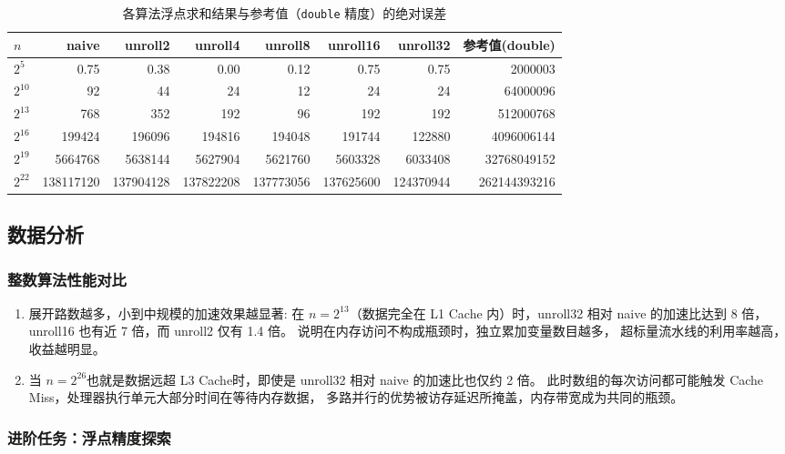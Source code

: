 \documentclass[a4paper]{article}
\begin{document}
\begin{table}[!ht]
\centering
\caption{各算法浮点求和结果与参考值（\texttt{double} 精度）的绝对误差}
\label{table:exp2_float}
\begin{tabular}{@{}lrrrrrrr@{}}
\toprule
$n$ & naive & unroll2 & unroll4 & unroll8 & unroll16 & unroll32 & 参考值(double) \\
\midrule
$2^5$   & 0.75   & 0.38   & 0.00   & 0.12   & 0.75   & 0.75   & 2000003 \\
$2^{10}$ & 92     & 44     & 24     & 12     & 24     & 24     & 64000096 \\
$2^{13}$ & 768    & 352    & 192    & 96     & 192    & 192    & 512000768 \\
$2^{16}$ & 199424 & 196096 & 194816 & 194048 & 191744 & 122880 & 4096006144 \\
$2^{19}$ & 5664768 & 5638144 & 5627904 & 5621760 & 5603328 & 6033408 & 32768049152 \\
$2^{22}$ & 138117120 & 137904128 & 137822208 & 137773056 & 137625600 & 124370944 & 262144393216 \\
\bottomrule
\end{tabular}
\end{table}

\subsection{数据分析}

\subsubsection{整数算法性能对比}
\begin{enumerate}
    \item 展开路数越多，小到中规模的加速效果越显著:
    在 $n=2^{13}$（数据完全在 L1 Cache 内）时，unroll32 相对 naive 的加速比达到 8 倍，
unroll16 也有近 7 倍，而 unroll2 仅有 1.4 倍。
说明在内存访问不构成瓶颈时，独立累加变量数目越多，
超标量流水线的利用率越高，收益越明显。

   \item 当 $n=2^{26}$也就是数据远超 L3 Cache时，即使是 unroll32 相对 naive 的加速比也仅约 2 倍。
此时数组的每次访问都可能触发 Cache Miss，处理器执行单元大部分时间在等待内存数据，
多路并行的优势被访存延迟所掩盖，内存带宽成为共同的瓶颈。
\end{enumerate}


\subsubsection{进阶任务：浮点精度探索}
\end{document}
